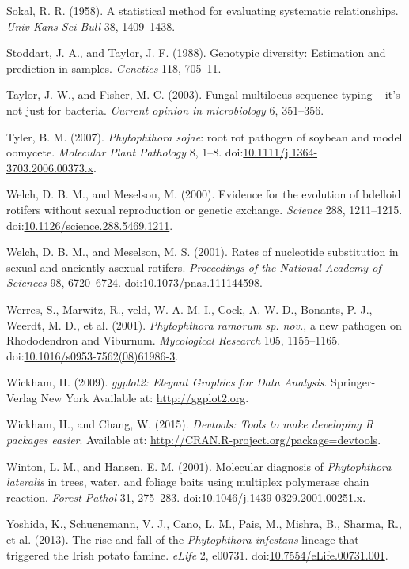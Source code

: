 \documentclass[double,12pt]{beavtex}
\begin{document}
  \hypertarget{ref-sokal1958statistical}{}
  Sokal, R. R. (1958). A statistical method for evaluating systematic
  relationships. \emph{Univ Kans Sci Bull} 38, 1409--1438.
  
  \hypertarget{ref-stoddart1988genotypic}{}
  Stoddart, J. A., and Taylor, J. F. (1988). Genotypic diversity:
  Estimation and prediction in samples. \emph{Genetics} 118, 705--11.
  
  \hypertarget{ref-taylor2003fungal}{}
  Taylor, J. W., and Fisher, M. C. (2003). Fungal multilocus sequence
  typing -- it's not just for bacteria. \emph{Current opinion in
  microbiology} 6, 351--356.
  
  \hypertarget{ref-tyler2007phytophthora}{}
  Tyler, B. M. (2007). \emph{Phytophthora sojae}: root rot pathogen of
  soybean and model oomycete. \emph{Molecular Plant Pathology} 8, 1--8.
  doi:\href{https://doi.org/10.1111/j.1364-3703.2006.00373.x}{10.1111/j.1364-3703.2006.00373.x}.
  
  \hypertarget{ref-welch2000evidence}{}
  Welch, D. B. M., and Meselson, M. (2000). Evidence for the evolution of
  bdelloid rotifers without sexual reproduction or genetic exchange.
  \emph{Science} 288, 1211--1215.
  doi:\href{https://doi.org/10.1126/science.288.5469.1211}{10.1126/science.288.5469.1211}.
  
  \hypertarget{ref-welch2001rates}{}
  Welch, D. B. M., and Meselson, M. S. (2001). Rates of nucleotide
  substitution in sexual and anciently asexual rotifers. \emph{Proceedings
  of the National Academy of Sciences} 98, 6720--6724.
  doi:\href{https://doi.org/10.1073/pnas.111144598}{10.1073/pnas.111144598}.
  
  \hypertarget{ref-werres2001phytophthora}{}
  Werres, S., Marwitz, R., veld, W. A. M. I., Cock, A. W. D., Bonants, P.
  J., Weerdt, M. D., et al. (2001). \emph{Phytophthora ramorum sp. nov.},
  a new pathogen on Rhododendron and Viburnum. \emph{Mycological Research}
  105, 1155--1165.
  doi:\href{https://doi.org/10.1016/s0953-7562(08)61986-3}{10.1016/s0953-7562(08)61986-3}.
  
  \hypertarget{ref-wickham2009ggplot2}{}
  Wickham, H. (2009). \emph{ggplot2: Elegant Graphics for Data Analysis}.
  Springer-Verlag New York Available at: \url{http://ggplot2.org}.
  
  \hypertarget{ref-wickham2015devtools}{}
  Wickham, H., and Chang, W. (2015). \emph{Devtools: Tools to make
  developing R packages easier}. Available at:
  \url{http://CRAN.R-project.org/package=devtools}.
  
  \hypertarget{ref-winton2001molecular}{}
  Winton, L. M., and Hansen, E. M. (2001). Molecular diagnosis of
  \emph{Phytophthora lateralis} in trees, water, and foliage baits using
  multiplex polymerase chain reaction. \emph{Forest Pathol} 31, 275--283.
  doi:\href{https://doi.org/10.1046/j.1439-0329.2001.00251.x}{10.1046/j.1439-0329.2001.00251.x}.
  
  \hypertarget{ref-yoshida2013rise}{}
  Yoshida, K., Schuenemann, V. J., Cano, L. M., Pais, M., Mishra, B.,
  Sharma, R., et al. (2013). The rise and fall of the \emph{Phytophthora
  infestans} lineage that triggered the Irish potato famine. \emph{eLife}
  2, e00731.
  doi:\href{https://doi.org/10.7554/eLife.00731.001}{10.7554/eLife.00731.001}.
\end{document}
